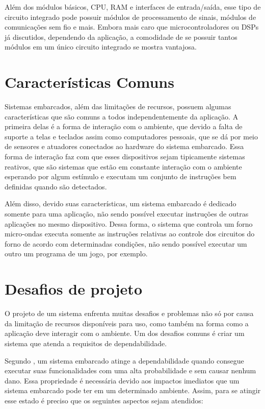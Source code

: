 Além dos módulos básicos, \gls{CPU}, \gls{RAM} e interfaces de entrada/saída, esse tipo de circuito integrado pode possuir módulos de processamento de sinais, módulos de comunicações sem fio e mais. Embora mais caro que microcontroladores ou \gls{DSP}s já discutidos, dependendo da aplicação, a comodidade de se possuir tantos módulos em um único circuito integrado se mostra vantajosa.



\section{Características Comuns}

Sistemas embarcados, além das limitações de recursos, possuem algumas características que são comuns a todos independentemente da aplicação. A primeira delas é a forma de interação com o ambiente, que devido a falta de suporte a telas e teclados assim como computadores pessoais, que se dá por meio de sensores e atuadores conectados ao hardware do sistema embarcado. Essa forma de interação faz com que esses dispositivos sejam tipicamente sistemas reativos, que são sistemas que estão em constante interação com o ambiente esperando por algum estímulo e executam um conjunto de instruções bem definidas quando são detectados.

Além disso, devido suas características, um sistema embarcado é dedicado somente para uma aplicação, não sendo possível executar instruções de outras aplicações no mesmo dispositivo. Dessa forma, o sistema que controla um forno micro-ondas executa somente as instruções relativas ao controle dos circuitos do forno de acordo com determinadas condições, não sendo possível executar um outro um programa de um jogo, por exemplo. 



\section{Desafios de projeto}

O projeto de um sistema enfrenta muitas desafios e problemas não só por causa da limitação de recursos disponíveis para uso, como também na forma como a aplicação deve interagir com o ambiente. Um dos desafios comuns é criar um sistema que atenda a requisitos de dependabilidade.

Segundo , um sistema embarcado atinge a dependabilidade quando consegue executar suas funcionalidades com uma alta probabilidade e sem causar nenhum dano. Essa propriedade é necessária devido aos impactos imediatos que um sistema embarcado pode ter em um determinado ambiente. Assim, para se atingir esse estado é preciso que os seguintes aspectos sejam atendidos:

